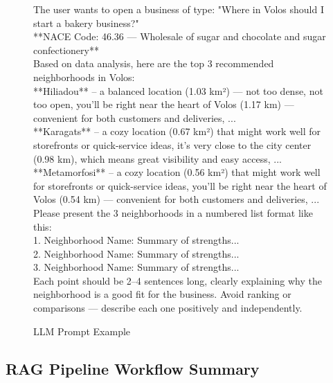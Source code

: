 \begin{figure}[!htbp]
  \centering
  \begin{tcolorbox}[myexample, title={LLM Prompt Example}]
  \vspace{0.5\baselineskip}
    The user wants to open a business of type: "Where in Volos should I start a bakery business?"\\
    **NACE Code: 46.36 — Wholesale of sugar and chocolate and sugar confectionery**\\
    Based on data analysis, here are the top 3 recommended neighborhoods in Volos:\\
    
    **Hiliadou** – a balanced location (1.03 km²) — not too dense, not too open, you'll be right near the heart of Volos (1.17 km) — convenient for both customers and deliveries, ...\\
    
    **Karagats** – a cozy location (0.67 km²) that might work well for storefronts or quick-service ideas, it's very close to the city center (0.98 km), which means great visibility and easy access, ...\\
    
    **Metamorfosi** – a cozy location (0.56 km²) that might work well for storefronts or quick-service ideas, you'll be right near the heart of Volos (0.54 km) — convenient for both customers and deliveries, ...\\
    
    Please present the 3 neighborhoods in a numbered list format like this:\\
    1. Neighborhood Name: Summary of strengths...\\
    2. Neighborhood Name: Summary of strengths...\\
    3. Neighborhood Name: Summary of strengths...\\
    Each point should be 2–4 sentences long, clearly explaining why the neighborhood is a good fit for the business. Avoid ranking or comparisons — describe each one positively and independently.
  \end{tcolorbox}
  \caption{LLM Prompt Example}
  \label{fig:llm_prompt}
\end{figure}



\subsection{RAG Pipeline Workflow Summary}

